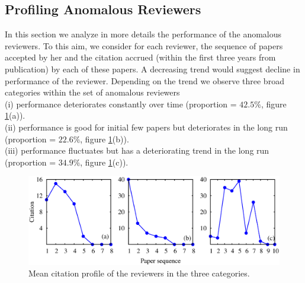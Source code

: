 \noindent
\subsection{Profiling Anomalous Reviewers}
\label{profile}


In this section we analyze in more details the performance of the anomalous reviewers. To this aim, we consider for each reviewer, the sequence of papers accepted by her and the citation accrued (within the first three years from publication) by each of these papers. A decreasing trend would suggest decline in performance of the reviewer. Depending on the trend we observe three broad categories within the set of anomalous reviewers \\
(i) performance deteriorates constantly over time (proportion = $42.5\%$, figure \ref{cit_prof}(a)).\\
(ii) performance is good for initial few papers but deteriorates in the long run (proportion = $22.6\%$, figure \ref{cit_prof}(b)).\\
(iii) performance fluctuates but has a deteriorating trend in the long run (proportion = $34.9\%$, figure \ref{cit_prof}(c)).
\begin{figure}
\centering
\includegraphics[scale=0.3]{./texfiles/Chapter_4/cikm/figures/profile_all.eps}
\caption{\label{cit_prof} Mean citation profile of the reviewers in the three categories.}
\vspace{3mm}
\end{figure}

\medskip